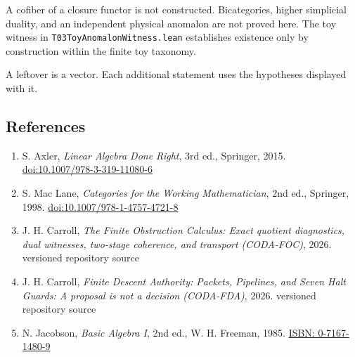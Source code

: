 \documentclass[
  11pt,
]{article}
\providecommand{\tightlist}{%
  \setlength{\itemsep}{0pt}\setlength{\parskip}{0pt}}
\begin{document}
A cofiber of a closure functor is not constructed. Bicategories, higher simplicial duality, and an independent physical anomalon are not proved here. The toy witness in \nolinkurl{T03ToyAnomalonWitness.lean} establishes existence only by construction within the finite toy taxonomy.

A leftover is a vector. Each additional statement uses the hypotheses displayed with it.

\subsection{References}\label{references}

\begin{enumerate}
\def\labelenumi{\arabic{enumi}.}
\tightlist
\item
  S. Axler, \emph{Linear Algebra Done Right}, 3rd ed., Springer, 2015. \href{https://doi.org/10.1007/978-3-319-11080-6}{doi:10.1007/978-3-319-11080-6}
\item
  S. Mac Lane, \emph{Categories for the Working Mathematician}, 2nd ed., Springer, 1998. \href{https://doi.org/10.1007/978-1-4757-4721-8}{doi:10.1007/978-1-4757-4721-8}
\item
  J. H. Carroll, \emph{The Finite Obstruction Calculus: Exact quotient diagnostics, dual witnesses, two-stage coherence, and transport (CODA-FOC)}, 2026. versioned repository source
\item
  J. H. Carroll, \emph{Finite Descent Authority: Packets, Pipelines, and Seven Halt Guards: A proposal is not a decision (CODA-FDA)}, 2026. versioned repository source
\item
  N. Jacobson, \emph{Basic Algebra I}, 2nd ed., W. H. Freeman, 1985. \href{https://www.worldcat.org/isbn/0716714809}{ISBN: 0-7167-1480-9}
\end{enumerate}
\end{document}
